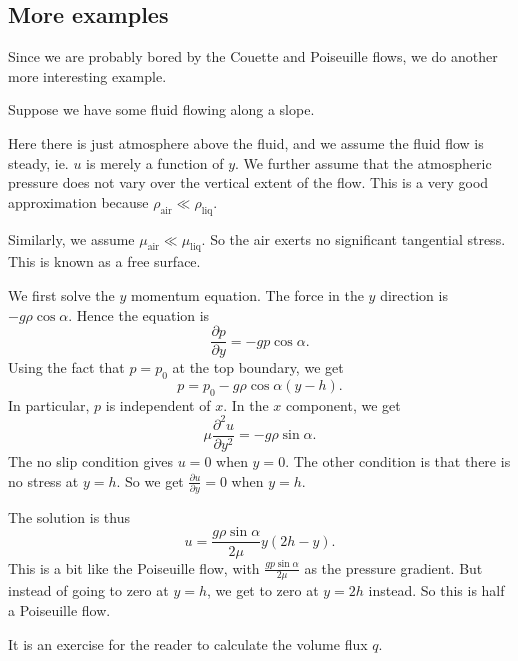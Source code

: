 \documentclass[a4paper]{article}
\begin{document}
\subsection{More examples}
Since we are probably bored by the Couette and Poiseuille flows, we do another more interesting example.
\begin{eg}
  Suppose we have some fluid flowing along a slope.
  \begin{center}
  \end{center}
  Here there is just atmosphere above the fluid, and we assume the fluid flow is steady, ie. $u$ is merely a function of $y$. We further assume that the atmospheric pressure does not vary over the vertical extent of the flow. This is a very good approximation because $\rho_{\mathrm{air}} \ll \rho_{\mathrm{liq}}$.

  Similarly, we assume $\mu_{\mathrm{air}} \ll \mu_{\mathrm{liq}}$. So the air exerts no significant tangential stress. This is known as a free surface.

  We first solve the $y$ momentum equation. The force in the $y$ direction is $-g \rho \cos \alpha$. Hence the equation is
  \[
    \frac{\partial p}{\partial y} = - gp \cos \alpha.
  \]
  Using the fact that $p = p_0$ at the top boundary, we get
  \[
    p = p_0 - g\rho \cos \alpha (y - h).
  \]
  In particular, $p$ is independent of $x$. In the $x$ component, we get
  \[
    \mu \frac{\partial^2 u}{\partial y^2} = - g\rho \sin \alpha.
  \]
  The no slip condition gives $u = 0$ when $y = 0$. The other condition is that there is no stress at $y = h$. So we get $\frac{\partial u}{\partial y} = 0$ when $y = h$.

  The solution is thus
  \[
    u = \frac{g\rho\sin \alpha}{2 \mu} y(2h - y).
  \]
  This is a bit like the Poiseuille flow, with $\frac{gp \sin \alpha}{2\mu}$ as the pressure gradient. But instead of going to zero at $y = h$, we get to zero at $y = 2h$ instead. So this is half a Poiseuille flow. %

  It is an exercise for the reader to calculate the volume flux $q$.
\end{eg}
\end{document}
